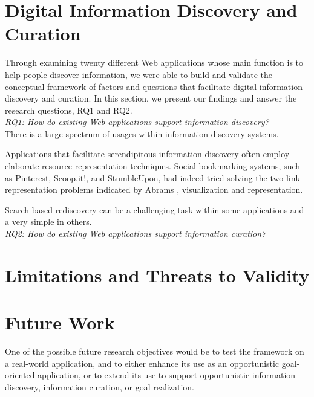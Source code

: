 \documentclass{casconpaper}
\begin{document}
{\section{Digital Information Discovery and Curation}

Through examining twenty different Web applications whose main function is to help people discover information, we were able to build and validate the conceptual framework of factors and questions that facilitate digital information discovery and curation. In this section, we present our findings and answer the research questions, RQ1 and RQ2. \\

\emph{RQ1: How do existing Web applications support information discovery?} \\

There is a large spectrum of usages within information discovery systems.  

Applications that facilitate serendipitous information discovery often employ elaborate resource representation techniques. Social-bookmarking systems, such as Pinterest, Scoop.it!, and StumbleUpon, had indeed tried solving the two link representation problems indicated by Abrams \cite{abrams}, visualization and representation.  

Search-based rediscovery can be a challenging task within some applications and a very simple in others.  \\

\emph{RQ2: How do existing Web applications support information curation?}\\
 
} %





{\section{Limitations and Threats to Validity}

} %

{\section{ Future Work}
One of the possible future research objectives would be to test the framework on a real-world application, and to either enhance its use as an opportunistic goal-oriented application, or to extend its use  to support opportunistic information discovery, information curation, or goal realization. 

} %
\end{document}

